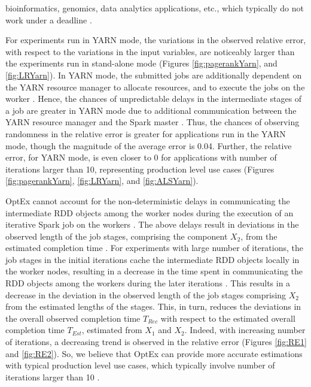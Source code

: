 \documentclass[conference]{IEEEtran}
\begin{document}
  bioinformatics, genomics, data analytics applications, etc., which typically do not work under a deadline \cite{spark:usecase9012}.
\par For experiments run in YARN mode, the variations in the observed relative error, with respect to the variations in the input variables, are noticeably larger than the experiments run in stand-alone mode (Figures \ref{fig:pagerankYarn}, and \ref{fig:LRYarn}). In YARN mode, the submitted jobs are additionally dependent on the YARN resource manager to allocate resources, and to execute the jobs on the worker \cite{HadoopYARN}. Hence, the chances of unpredictable delays in the intermediate stages of a job are greater in YARN mode due to additional communication between the YARN resource manager and the Spark master \cite{HadoopYARN}. Thus, the chances of observing randomness in the relative error is greater for applications run in the YARN mode, though the magnitude of the average error is 0.04. Further, the relative error, for YARN mode, is even closer to 0 for  applications with number of iterations larger than 10, representing production level use cases \cite{spark:usecase1234, spark:usecase5678} (Figures \ref{fig:pagerankYarn}, \ref{fig:LRYarn}, and \ref{fig:ALSYarn}).
\par OptEx cannot account for the non-deterministic delays in communicating the intermediate RDD objects among the worker nodes during the execution of an iterative Spark job on the workers \cite{Zaharia:2012:RDD:2228298.2228301}. The above delays result in deviations in the observed length of the job stages, comprising the component $X_2$, from the estimated completion time \cite{Zaharia:2012:RDD:2228298.2228301}. For experiments with large number of iterations, the job stages in the initial iterations cache the intermediate RDD objects locally in the worker nodes, resulting in a decrease in the time spent in communicating the RDD objects among the workers during the later iterations \cite{Zaharia:2012:RDD:2228298.2228301}.  This results in a decrease in the deviation in the observed length of the job stages comprising $X_2$ from the estimated lengths of the stages. This, in turn, reduces the deviations in the overall observed completion time $\mathit{T_{\mathit{Rec}}}$ with respect to the estimated overall completion time $\mathit{T_{\mathit{Est}}}$, estimated from $X_1$ and $X_2$. Indeed, with increasing number of iterations, a decreasing trend
  is observed in the relative error (Figures \ref{fig:RE1} and \ref{fig:RE2}). So, we believe that OptEx can provide more accurate estimations with typical production level use cases, which typically involve number of iterations larger than 10 \cite{spark:usecase1234, spark:usecase5678}.
\end{document}
